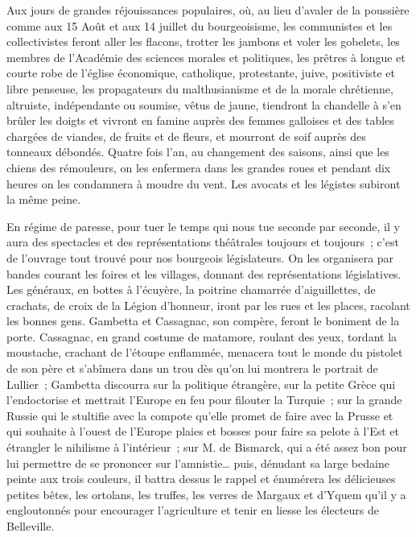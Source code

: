 \documentclass[french,twoside]{book} %
\begin{document}
Aux jours de grandes réjouissances populaires, où, au lieu d’avaler de la poussière comme aux 15 Août et aux 14 juillet du bourgeoisisme, les communistes et les collectivistes feront aller les flacons, trotter les jambons et voler les gobelets, les membres de l’Académie des sciences morales et politiques, les prêtres à longue et courte robe de l’église économique, catholique, protestante, juive, positiviste et libre penseuse, les propagateurs du malthusianisme et de la morale chrétienne, altruiste, indépendante ou soumise, vêtus de jaune, tiendront la chandelle à s’en brûler les doigts et vivront en famine auprès des femmes galloises et des tables chargées de viandes, de fruits et de fleurs, et mourront de soif auprès des tonneaux débondés. Quatre fois l’an, au changement des saisons, ainsi que les chiens des rémouleurs, on les enfermera dans les grandes roues et pendant dix heures on les condamnera à moudre du vent. Les avocats et les légistes subiront la même peine.\par
En régime de paresse, pour tuer le temps qui nous tue seconde par seconde, il y aura des spectacles et des représentations théâtrales toujours et toujours ; c’est de l’ouvrage tout trouvé pour nos bourgeois législateurs. On les organisera par bandes courant les foires et les villages, donnant des représentations législatives. Les généraux, en bottes à l’écuyère, la poitrine chamarrée d’aiguillettes, de crachats, de croix de la Légion d’honneur, iront par les rues et les places, racolant les bonnes gens. Gambetta et Cassagnac, son compère, feront le boniment de la porte. Cassagnac, en grand costume de matamore, roulant des yeux, tordant la moustache, crachant de l’étoupe enflammée, menacera tout le monde du pistolet de son père et s’abîmera dans un trou dès qu’on lui montrera le portrait de Lullier ; Gambetta discourra sur la politique étrangère, sur la petite Grèce qui l’endoctorise et mettrait l’Europe en feu pour filouter la Turquie ; sur la grande Russie qui le stultifie avec la compote qu’elle promet de faire avec la Prusse et qui souhaite à l’ouest de l’Europe plaies et bosses pour faire sa pelote à l’Est et étrangler le nihilisme à l’intérieur ; sur M. de Bismarck, qui a été assez bon pour lui permettre de se prononcer sur l’amnistie… puis, dénudant sa large bedaine peinte aux trois couleurs, il battra dessus le rappel et énumérera les délicieuses petites bêtes, les ortolans, les truffes, les verres de Margaux et d’Yquem qu’il y a engloutonnés pour encourager l’agriculture et tenir en liesse les électeurs de Belleville.\par
\end{document}
